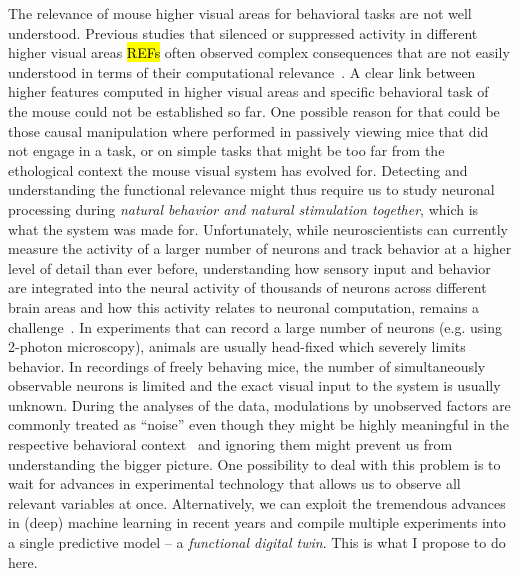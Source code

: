 \documentclass[COG,11pt]{ercgrant}
\begin{document}
The relevance of mouse higher visual areas for behavioral tasks are not well understood.
Previous studies that silenced or suppressed activity in different higher visual areas \hl{REFs} often observed complex consequences that are not easily understood in terms of their computational relevance~\parencite{Froudarakis2019-yt}. 
A clear link between higher features computed in higher visual areas and specific behavioral task of the mouse could not be established so far. 
One possible reason for that could be those causal manipulation where performed in passively viewing mice that did not engage in a task, or on simple tasks that might be too far from the ethological context the mouse visual system has evolved for. 
Detecting and understanding the functional relevance might thus require us to study neuronal processing during \textit{natural behavior and natural stimulation together}, which is what the system was made for. 
Unfortunately, while neuroscientists can currently measure the activity of a larger number of neurons and track behavior at a higher level of detail than ever before, understanding how sensory input and behavior are integrated into the neural activity of thousands of neurons across different brain areas and how this activity relates to neuronal computation, remains a challenge~\parencite{Urai2022-fz}.
In experiments that can record a large number of neurons (e.g. using 2-photon microscopy), animals are usually head-fixed which severely limits behavior. 
In recordings of freely behaving mice, the number of simultaneously observable neurons is limited and the exact visual input to the system is usually unknown. 
During the analyses of the data, modulations by unobserved factors are commonly treated as ``noise'' even though they might be highly meaningful in the respective behavioral context~\parencite{Musall2019-kd} and ignoring them might prevent us from understanding the bigger picture.
One possibility to deal with this problem is to wait for advances in experimental technology that allows us to observe all relevant variables at once. Alternatively, we can exploit the tremendous advances in (deep) machine learning in recent years and compile multiple experiments into a single predictive model -- a \textit{functional digital twin}. This is what I propose to do here. 
\end{document}

